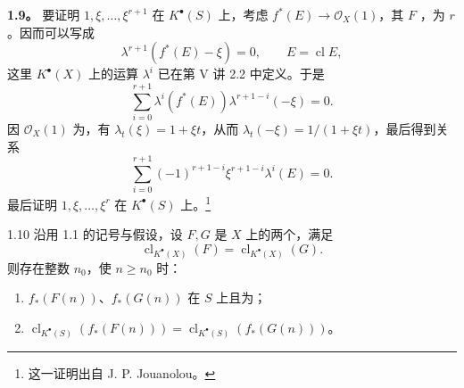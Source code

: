 \textbf{1.9。} 要证明 $1,\xi,\ldots,\xi^{r+1}$ 在 $K^\bullet(S)$ 上，考虑 $f^*(E)\to\mathcal O_X(1)$，其 $F$ ，为 $r$。因而可以写成
\[
\lambda^{r+1}(f^*(E)-\xi)=0,\qquad E=\operatorname{cl}E,
\]
这里 $K^\bullet(X)$ 上的运算 $\lambda^i$ 已在第 V 讲 2.2 中定义。于是
\[
\sum_{i=0}^{r+1}\lambda^i(f^*(E))\lambda^{r+1-i}(-\xi)=0.
\]
因 $\mathcal O_X(1)$ 为，有 $\lambda_t(\xi)=1+\xi t$，从而 $\lambda_t(-\xi)=1/(1+\xi t)$，最后得到关系
\[
\sum_{i=0}^{r+1}(-1)^{r+1-i}\xi^{r+1-i}\lambda^i(E)=0.\tag{1.9.1}
\]
最后证明 $1,\xi,\ldots,\xi^r$ 在 $K^\bullet(S)$ 上。\footnote{这一证明出自 J. P. Jouanolou。}
\begin{SGAresult}{}{1.10}
沿用 1.1 的记号与假设，设 $F,G$ 是 $X$ 上的两个，满足
\[
\operatorname{cl}_{K^\bullet(X)}(F)=\operatorname{cl}_{K^\bullet(X)}(G).
\]
则存在整数 $n_0$，使 $n\geq n_0$ 时：
\begin{enumerate}
\item[i)] $f_*(F(n))$、$f_*(G(n))$ 在 $S$ 上且为；
\item[ii)] $\operatorname{cl}_{K^\bullet(S)}(f_*(F(n)))=\operatorname{cl}_{K^\bullet(S)}(f_*(G(n)))$。
\end{enumerate}
\end{SGAresult}
